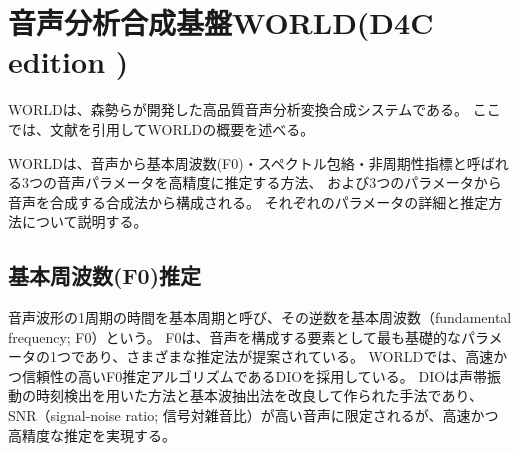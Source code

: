 \section{音声分析合成基盤WORLD\cite{morise2016world}(D4C edition \cite{morise2016worldD4Ce})}
\label{sec:WORLDS}

WORLDは、森勢らが開発した高品質音声分析変換合成システムである。
ここでは、文献\cite{morise2016world,morise2016worldD4Cj,morise2019wasei}を引用してWORLDの概要を述べる。

WORLDは、音声から基本周波数(F0)・スペクトル包絡・非周期性指標と呼ばれる3つの音声パラメータを高精度に推定する方法、
および3つのパラメータから音声を合成する合成法から構成される。
それぞれのパラメータの詳細と推定方法について説明する。

\subsection{基本周波数(F0)推定\cite{morise2016Kihonha}}

音声波形の1周期の時間を基本周期と呼び、その逆数を基本周波数（fundamental frequency; F0）という。
F0は、音声を構成する要素として最も基礎的なパラメータの1つであり、さまざまな推定法が提案されている。
WORLDでは、高速かつ信頼性の高いF0推定アルゴリズムであるDIO\cite{yegnana2009DIO}を採用している。
DIOは声帯振動の時刻検出を用いた方法と基本波抽出法を改良して作られた手法であり、
SNR（signal-noise ratio; 信号対雑音比）が高い音声に限定されるが、高速かつ高精度な推定を実現する。

